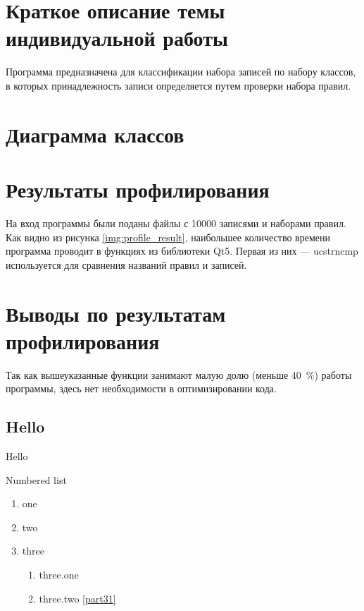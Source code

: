 \section{Краткое описание темы индивидуальной работы}
Программа предназначена для классификации набора записей по набору классов, в 
которых принадлежность записи определяется путем проверки набора правил.

\section{Диаграмма классов}

\section{Результаты профилирования}
На вход программы были поданы файлы с 10000 записями и наборами правил. Как видно из рисунка \ref{img:profile_result}, наибольшее количество времени программа проводит в функциях из библиотеки Qt5. Первая из них — ucstrncmp используется для сравнения названий правил и записей.

\section{Выводы по результатам профилирования}
Так как вышеуказанные функции занимают малую долю (меньше 40 \%) работы программы, здесь нет необходимости в оптимизировании кода.

\subsection{Hello}
Hello

Numbered list
\begin{enumerate}
    \item one
    \item two
    \item three
        \begin{enumerate}
            \item\label{part31} three.one
            \item three.two \ref{part31}
        \end{enumerate}
\end{enumerate}
